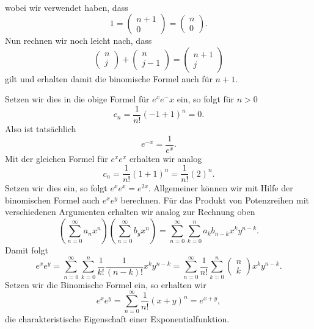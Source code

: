 \documentclass[letterpaper,10pt,english]{jupyterBook}
\begin{document}
\begin{emphBox}{}{}
\begin{align*}
\end{align*}
wobei wir verwendet haben, dass
\begin{equation*}
1 =
\begin{pmatrix} n+1\\ 0 \end{pmatrix} 
= \begin{pmatrix} n\\ 0 \end{pmatrix}.
\end{equation*}
Nun rechnen wir noch leicht nach, dass
\begin{equation*}
\begin{pmatrix} n\\j \end{pmatrix} +  \begin{pmatrix} n\\j-1 \end{pmatrix}
=
\begin{pmatrix} n+1\\j \end{pmatrix}
\end{equation*}
gilt und erhalten damit die binomische Formel auch für \(n+1\).
\end{emphBox}

Setzen wir dies in die obige Formel für \(e^x e^-x\) ein, so folgt für \(n > 0\)
\begin{equation*}
c_n = \frac{1}{n!}(-1+1)^n = 0 .
\end{equation*}
Also ist tatsächlich
\begin{equation*}
 e^{-x} = \frac{1}{e^x}.
\end{equation*}
Mit der gleichen Formel für \(e^x e^x\) erhalten wir analog
\begin{equation*}
 c_n = \frac{1}{n!}(1+1)^n =  \frac{1}{n!}(2)^n .
\end{equation*}
Setzen wir dies ein, so folgt \(e^x e^x = e^{2x}\).
Allgemeiner können wir mit Hilfe der binomischen Formel auch \(e^x e^y\) berechnen. Für das Produkt von Potenzreihen mit verschiedenen Argumenten erhalten wir analog zur Rechnung oben
\begin{equation*}
\left( \sum_{n=0}^\infty  a_n x^n \right) \left( \sum_{n=0}^\infty b_y x^n \right) =
\sum_{n=0}^\infty \sum_{k=0}^n a_k b_{n-k} x^k y^{n-k}.
\end{equation*}
Damit folgt
\begin{equation*}
 e^x e^y = \sum_{n=0}^\infty \sum_{k=0}^n \frac{1}{k!} \frac{1}{(n-k)!} x^k y^{n-k} =
\sum_{n=0}^\infty \frac{1}{n!} \sum_{k=0}^n (\begin{matrix} n\\ k \end{matrix} )  x^k y^{n-k}.
\end{equation*}
Setzen wir die Binomische Formel ein, so erhalten wir
\begin{equation*}
 e^x e^y = \sum_{n=0}^\infty \frac{1}{n!}  (x+y)^n = e^{x+y},
\end{equation*}
die charakteristische Eigenschaft einer Exponentialfunktion.
\end{document}
